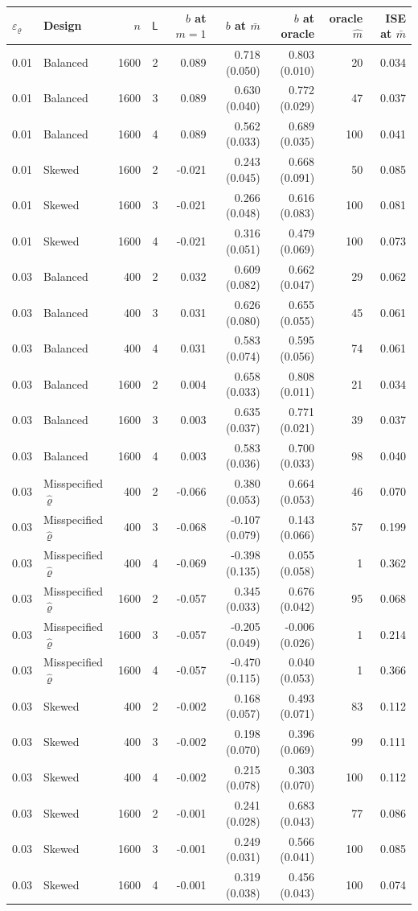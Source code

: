 \begin{tabular}{llrrrrrrr}
\toprule
$\varepsilon_\varrho$ & Design & $n$ & $\mathsf L$ & $b$ at $m=1$ & $b$ at $\bar m$ & $b$ at oracle & oracle $\hat m$ & ISE at $\bar m$ \\
\midrule
0.01 & Balanced & 1600 & 2 & 0.089 & 0.718 (0.050) & 0.803 (0.010) & 20 & 0.034 \\
0.01 & Balanced & 1600 & 3 & 0.089 & 0.630 (0.040) & 0.772 (0.029) & 47 & 0.037 \\
0.01 & Balanced & 1600 & 4 & 0.089 & 0.562 (0.033) & 0.689 (0.035) & 100 & 0.041 \\
0.01 & Skewed & 1600 & 2 & -0.021 & 0.243 (0.045) & 0.668 (0.091) & 50 & 0.085 \\
0.01 & Skewed & 1600 & 3 & -0.021 & 0.266 (0.048) & 0.616 (0.083) & 100 & 0.081 \\
0.01 & Skewed & 1600 & 4 & -0.021 & 0.316 (0.051) & 0.479 (0.069) & 100 & 0.073 \\
0.03 & Balanced & 400 & 2 & 0.032 & 0.609 (0.082) & 0.662 (0.047) & 29 & 0.062 \\
0.03 & Balanced & 400 & 3 & 0.031 & 0.626 (0.080) & 0.655 (0.055) & 45 & 0.061 \\
0.03 & Balanced & 400 & 4 & 0.031 & 0.583 (0.074) & 0.595 (0.056) & 74 & 0.061 \\
0.03 & Balanced & 1600 & 2 & 0.004 & 0.658 (0.033) & 0.808 (0.011) & 21 & 0.034 \\
0.03 & Balanced & 1600 & 3 & 0.003 & 0.635 (0.037) & 0.771 (0.021) & 39 & 0.037 \\
0.03 & Balanced & 1600 & 4 & 0.003 & 0.583 (0.036) & 0.700 (0.033) & 98 & 0.040 \\
0.03 & Misspecified $\hat\varrho$ & 400 & 2 & -0.066 & 0.380 (0.053) & 0.664 (0.053) & 46 & 0.070 \\
0.03 & Misspecified $\hat\varrho$ & 400 & 3 & -0.068 & -0.107 (0.079) & 0.143 (0.066) & 57 & 0.199 \\
0.03 & Misspecified $\hat\varrho$ & 400 & 4 & -0.069 & -0.398 (0.135) & 0.055 (0.058) & 1 & 0.362 \\
0.03 & Misspecified $\hat\varrho$ & 1600 & 2 & -0.057 & 0.345 (0.033) & 0.676 (0.042) & 95 & 0.068 \\
0.03 & Misspecified $\hat\varrho$ & 1600 & 3 & -0.057 & -0.205 (0.049) & -0.006 (0.026) & 1 & 0.214 \\
0.03 & Misspecified $\hat\varrho$ & 1600 & 4 & -0.057 & -0.470 (0.115) & 0.040 (0.053) & 1 & 0.366 \\
0.03 & Skewed & 400 & 2 & -0.002 & 0.168 (0.057) & 0.493 (0.071) & 83 & 0.112 \\
0.03 & Skewed & 400 & 3 & -0.002 & 0.198 (0.070) & 0.396 (0.069) & 99 & 0.111 \\
0.03 & Skewed & 400 & 4 & -0.002 & 0.215 (0.078) & 0.303 (0.070) & 100 & 0.112 \\
0.03 & Skewed & 1600 & 2 & -0.001 & 0.241 (0.028) & 0.683 (0.043) & 77 & 0.086 \\
0.03 & Skewed & 1600 & 3 & -0.001 & 0.249 (0.031) & 0.566 (0.041) & 100 & 0.085 \\
0.03 & Skewed & 1600 & 4 & -0.001 & 0.319 (0.038) & 0.456 (0.043) & 100 & 0.074 \\
\bottomrule
\end{tabular}
